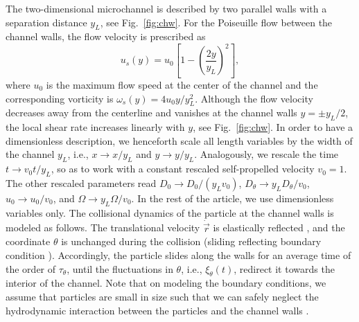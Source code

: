 \documentclass[aps,pre,preprint,superscriptaddress,amsmath,amssymb,nofootinbib]{revtex4}
\begin{document}
 The two-dimensional microchannel is described by two parallel walls with a separation distance $y_L$, see Fig.~\ref{fig:chw}. 
 For the Poiseuille flow between the channel walls, the flow velocity is prescribed as 
 \begin{equation}
 u_s(y) = u_0 \left[1 -  \left( \frac{2y}{y_L} \right)^2 \right],
 \label{eq:flow_field}
 \end{equation}
 where $u_0$ is the maximum flow speed at the center of the channel and the corresponding vorticity is $\omega_s (y) = 4 u_0 y/ y_L ^2$.
 Although the flow velocity decreases away from the centerline and vanishes at the channel walls $y = \pm y_L/2$, the local shear rate increases linearly with $y$, see Fig.~\ref{fig:chw}.  
 In order to have a dimensionless description, we henceforth scale all length variables by the width of the channel $y_{L}$, i.e., $x \to x/y_{L}$ and $y \to y/y_{L}$.
Analogously, we rescale the time $t \to v_0 t/y_{L}$, so as to work with a constant rescaled self-propelled velocity $v_0 = 1$.
 The other rescaled parameters read $D_0 \to D_0/(y_{L} v_0)$, $D_{\theta} \to y_{L} D_{\theta}/v_0$, $u_0 \to u_0/v_0$, and $\Omega \to y_{L} \Omega/v_0$.
 In the rest of the article, we use dimensionless variables only.
  The collisional dynamics of the particle at the channel walls is modeled as follows. 
 The translational velocity $\dot{\vec{r}}$ is elastically reflected \cite{Khatri_JCP, Khatri_pre1, Khatri_JSTAT, Khatri_pre2}, and the coordinate $\theta$ is unchanged during the collision (sliding reflecting boundary condition \cite{Ghosh_PRL, Zhang_et_al@PF:2010}).
 Accordingly, the particle slides along the walls for an average time of the order of $\tau_\theta$, until the fluctuations in $\theta$, i.e., $\xi_\theta (t)$, redirect it towards the interior of the channel. 
 Note that on modeling the boundary conditions, we assume that particles are small in size such that we can safely neglect 
 the hydrodynamic interaction between the particles and the channel walls \cite{Lauga_JFM}.
 
\end{document}
